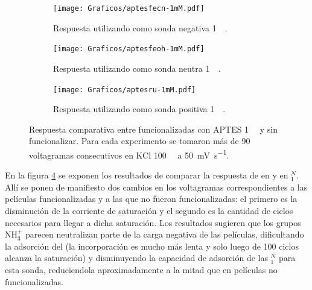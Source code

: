 				 \begin{figure}[ht!]	
					\begin{subfigure}[t]{0.495\textwidth}
			 	    \texttt{[image: Graficos/aptesfecn-1mM.pdf]}
			        \caption{Respuesta utilizando como sonda negativa \ferroferri\space \SI{1}{\milli\Molar}.}
			        \label{fig:aptes1mM-vc-fe}
			        \end{subfigure}
			        \begin{subfigure}[t]{0.495\textwidth}
			 	    \texttt{[image: Graficos/aptesfeoh-1mM.pdf]}
			        \caption{Respuesta utilizando como sonda neutra \fc\space \SI{1}{\milli\Molar}.}
			        \label{fig:aptes1mM-vc-fc}
			        \end{subfigure}
			        \begin{center}
			        \begin{subfigure}[t]{0.60\textwidth}
			 	    \texttt{[image: Graficos/aptesru-1mM.pdf]}
			        \caption{Respuesta utilizando como sonda positiva \aminorutenio\space \SI{1}{\milli\Molar}.}
			        \label{fig:aptes1mM-vc-ru}
			        \end{subfigure}
			        \end{center}
			        \caption[Voltagramas de \pdmZ$^P_3$ con \aminorutenio\space y \ferroferri]{Respuesta comparativa entre \pdmZ\space funcionalizadas con APTES \SI{1}{\milli\Molar} y sin funcionalizar. Para cada experimento se tomaron más de 90 voltagramas consecutivos en KCl \SI{100}{\milli\Molar} a \SI{50}{\milli\volt\per\second}.}
			        \label{fig:aptes1mM-vc}
			      	\end{figure}

		  
		  \vspace*{2mm} En la figura \ref{fig:aptes1mM-vc} se exponen los resultados de comparar la respuesta de \ru\space en \pdmZ\space y en \pdmZ$^N_1$. Allí se ponen de manifiesto dos cambios en los voltagramas correspondientes a las películas funcionalizadas y a las que no fueron funcionalizadas: el primero es la disminución de la corriente de saturación y el segundo es la cantidad de ciclos necesarios para llegar a dicha saturación. Los resultados sugieren que los grupos NH$_3^+$ parecen neutralizan parte de la carga negativa de las películas\cite{calvo2009f}, dificultando la adsorción del \ru\space (la incorporación es mucho más lenta y solo luego de 100 ciclos alcanza la saturación) y disminuyendo la capacidad de adsorción de las \pdmZ$^N_{1}$ para esta sonda, reduciendola aproximadamente a la mitad que en películas no funcionalizadas.

